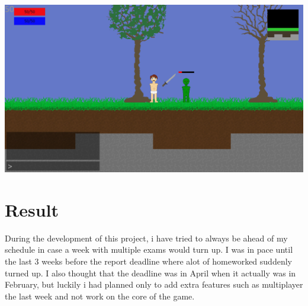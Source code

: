 \documentclass[a4paper,12pt]{article}
\begin{document}
\includegraphics[width=\textwidth]{img/screenshot3.eps}



\clearpage

\section{Result}

During the development of this project, i have tried to always be ahead of my schedule in case a week with multiple exams would turn up.
I was in pace until the last 3 weeks before the report deadline where alot of homeworked suddenly turned up.
I also thought that the deadline was in April when it actually was in February, but luckily i had planned only to add extra features such as multiplayer the last week and not work on the core of the game.
\end{document}
